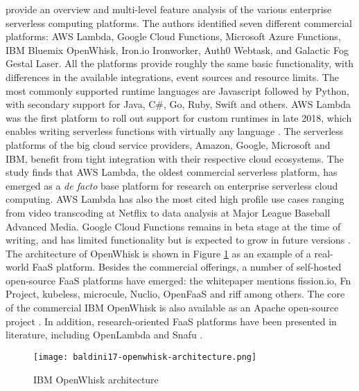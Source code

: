 \textcite{lynn2017preliminary} provide an overview and multi-level feature analysis of the various enterprise serverless computing platforms. The authors identified seven different commercial platforms: AWS Lambda, Google Cloud Functions, Microsoft Azure Functions, IBM Bluemix OpenWhisk, Iron.io Ironworker, Auth0 Webtask, and Galactic Fog Gestal Laser. All the platforms provide roughly the same basic functionality, with differences in the available integrations, event sources and resource limits. The most commonly supported runtime languages are Javascript followed by Python, with secondary support for Java, C\#, Go, Ruby, Swift and others. AWS Lambda was the first platform to roll out support for custom runtimes in late 2018, which enables writing serverless functions with virtually any language \parencite{awslambda0218}. The serverless platforms of the big cloud service providers, Amazon, Google, Microsoft and IBM, benefit from tight integration with their respective cloud ecosystems. The study finds that AWS Lambda, the oldest commercial serverless platform, has emerged as a \textit{de facto} base platform for research on enterprise serverless cloud computing. AWS Lambda has also the most cited high profile use cases ranging from video transcoding at Netflix to data analysis at Major League Baseball Advanced Media. Google Cloud Functions remains in beta stage at the time of writing, and has limited functionality but is expected to grow in future versions \parencite{google18cloudFunctions}. The architecture of OpenWhisk is shown in Figure \ref{fig:openwhisk} as an example of a real-world FaaS platform. Besides the commercial offerings, a number of self-hosted open-source FaaS platforms have emerged: the \textcite{cncf18serverlessWG} whitepaper mentions fission.io, Fn Project, kubeless, microcule, Nuclio, OpenFaaS and riff among others. The core of the commercial IBM OpenWhisk is also available as an Apache open-source project \parencite{ibm18cloudFunctions}. In addition, research-oriented FaaS platforms have been presented in literature, including OpenLambda \parencite{hendrickson16openlambda} and Snafu \parencite{spillner17snafu}.

\begin{figure}[h]
  \centering
  \texttt{[image: baldini17-openwhisk-architecture.png]}
  \caption{IBM OpenWhisk architecture \parencite{baldini17currentTrends}}
  \label{fig:openwhisk}
\end{figure}

